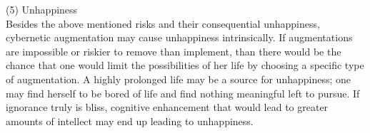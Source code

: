 
(5) Unhappiness \\

Besides the above mentioned risks and their consequential unhappiness, cybernetic augmentation may cause unhappiness intrinsically. If augmentations are impossible or riskier to remove than implement, than there would be the chance that one would limit the possibilities of her life by choosing a specific type of augmentation. A highly prolonged life may be a source for unhappiness; one may find herself to be bored of life and find nothing meaningful left to pursue. If ignorance truly is bliss, cognitive enhancement that would lead to greater amounts of intellect may end up leading to unhappiness.




